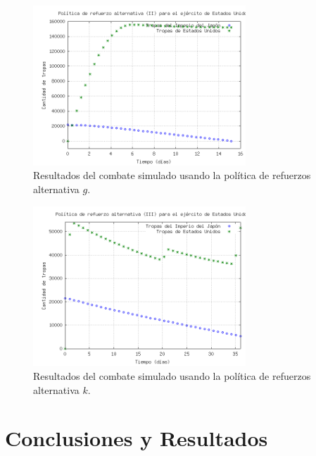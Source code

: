 \documentclass{sig-alternate}
\begin{document}
\begin{figure}[h]
\begin{center}
\includegraphics[width=8cm]{reinforce3.png}
\caption{\label{fig:reinforce3}Resultados del combate simulado usando la política de refuerzos alternativa $g$.}
\end{center}
\end{figure}


\begin{figure}[h]
\begin{center}
\includegraphics[clip, width=8cm]{reinforce4.png}
\caption{\label{fig:reinforce4}Resultados del combate simulado usando la política de refuerzos alternativa $k$.}
\end{center}
\end{figure}


\section{Conclusiones y Resultados}
\label{sec:conclusiones}
\end{document}
